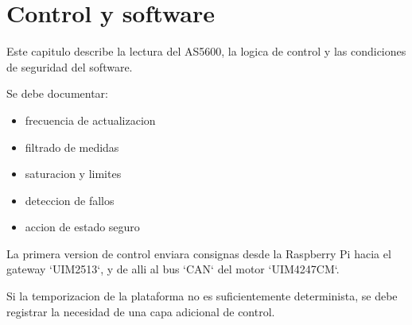 \chapter{Control y software}

Este capitulo describe la lectura del AS5600, la logica de control y las condiciones de seguridad del software.

Se debe documentar:

\begin{itemize}
  \item frecuencia de actualizacion
  \item filtrado de medidas
  \item saturacion y limites
  \item deteccion de fallos
  \item accion de estado seguro
\end{itemize}

La primera version de control enviara consignas desde la Raspberry Pi hacia el
gateway `UIM2513`, y de alli al bus `CAN` del motor `UIM4247CM`.

Si la temporizacion de la plataforma no es suficientemente determinista, se
debe registrar la necesidad de una capa adicional de control.
